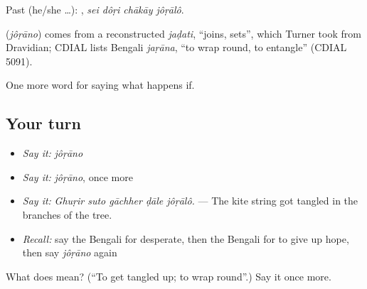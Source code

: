 Past (he/she …):    , \emph{sei dôṛi chākāy jôṛālô}.

\begin{cousinweb}
\textbf{} (\emph{jôṛāno}) comes from a reconstructed \emph{jaḍati}, \textquotedblleft{}joins, sets\textquotedblright{}, which Turner took from Dravidian; CDIAL lists Bengali \emph{jaṛāna}, \textquotedblleft{}to wrap round, to entangle\textquotedblright{} (CDIAL 5091).
\end{cousinweb}

\begin{grammarlens}[title={What you've built}]
One more word for saying what happens if.
\end{grammarlens}

\subsection*{Your turn}
\begin{itemize}
\raggedright
  \item \emph{Say it:} \emph{jôṛāno}
  \item \emph{Say it:} \emph{jôṛāno}, once more
  \item \emph{Say it:} \emph{Ghuṛir suto gāchher ḍāle jôṛālô.} — The kite string got tangled in the branches of the tree.
  \item \emph{Recall:} say the Bengali for desperate, then the Bengali for to give up hope, then say \emph{jôṛāno} again
\end{itemize}

\begin{tcolorbox}[breakable,colback=teal!4,colframe=teal!35!black,title={Before you move on}]
What does  mean? (\textquotedblleft{}To get tangled up; to wrap round\textquotedblright{}.) Say it once more.
\end{tcolorbox}
